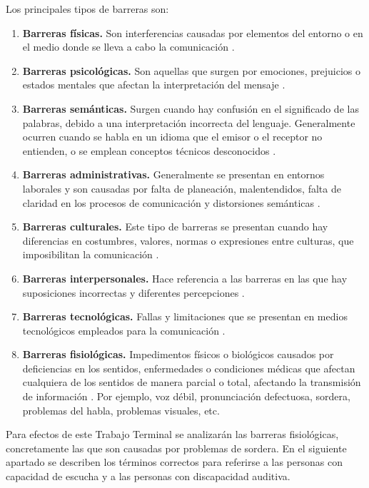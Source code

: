 Los principales tipos de barreras son:
\begin{enumerate}
    \item \textbf{Barreras físicas.} Son interferencias causadas por elementos del entorno o en el medio donde se lleva a cabo la comunicación \cite{ref25}.
    \item \textbf{Barreras psicológicas.} Son aquellas que surgen por emociones, prejuicios o estados mentales que afectan la interpretación del mensaje \cite{ref25}.
    \item \textbf{Barreras semánticas.} Surgen cuando hay confusión en el significado de las palabras, debido a una interpretación incorrecta del lenguaje. Generalmente ocurren cuando se habla en un idioma que el emisor o el receptor no entienden, o se emplean conceptos técnicos desconocidos \cite{ref25}.
    \item \textbf{Barreras administrativas.} Generalmente se presentan en entornos laborales y son causadas por falta de planeación, malentendidos, falta de claridad en los procesos de comunicación y distorsiones semánticas \cite{ref25}.
    \item \textbf{Barreras culturales.} Este tipo de barreras se presentan cuando hay diferencias en costumbres, valores, normas o expresiones entre culturas, que imposibilitan la comunicación \cite{ref25}.
    \item \textbf{Barreras interpersonales.} Hace referencia a las barreras en las que hay suposiciones incorrectas y diferentes percepciones \cite{ref25}.
    \item \textbf{Barreras tecnológicas.} Fallas y limitaciones que se presentan en medios tecnológicos empleados para la comunicación \cite{ref25}.
    \item \textbf{Barreras fisiológicas.} Impedimentos físicos o biológicos causados por deficiencias en los sentidos, enfermedades o condiciones médicas que afectan cualquiera de los sentidos de manera parcial o total, afectando la transmisión de información \cite{ref25}. Por ejemplo, voz débil, pronunciación defectuosa, sordera, problemas del habla, problemas visuales, etc.
\end{enumerate}
Para efectos de este Trabajo Terminal se analizarán las barreras fisiológicas, concretamente las que son causadas por problemas de sordera. En el siguiente apartado se describen los términos correctos para referirse a las personas con capacidad de escucha y a las personas con discapacidad auditiva.\\

